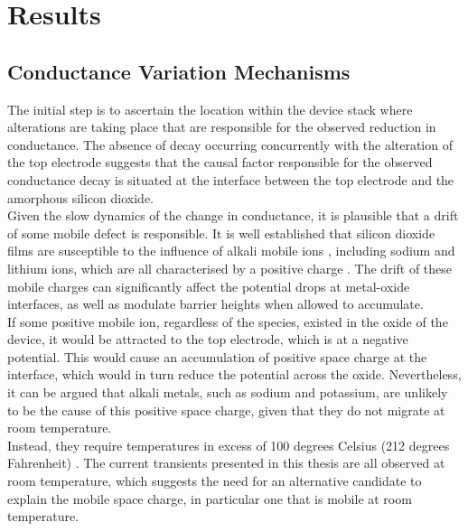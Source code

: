 \section[Results]{Results}

\subsection[Conductance Variation Mechanisms]{Conductance Variation Mechanisms}

The initial step is to ascertain the location within the device stack where alterations are taking place that are responsible for the observed reduction in conductance. The absence of decay occurring concurrently with the alteration of the top electrode suggests that the causal factor responsible for the observed conductance decay is situated at the interface between the top electrode and the amorphous silicon dioxide. \\

\noindent Given the slow dynamics of the change in conductance, it is plausible that a drift of some mobile defect is responsible. It is well established that silicon dioxide films are susceptible to the influence of alkali mobile ions \cite{snow1965ion}, including sodium and lithium ions, which are all characterised by a positive charge \cite{yon1966sodium}. The drift of these mobile charges can significantly affect the potential drops at metal-oxide interfaces, as well as modulate barrier heights when allowed to accumulate.\\

\noindent If some positive mobile ion, regardless of the species, existed in the oxide of the device, it would be attracted to the top electrode, which is at a negative potential. This would cause an accumulation of positive space charge at the interface, which would in turn reduce the potential across the oxide. Nevertheless, it can be argued that alkali metals, such as sodium and potassium, are unlikely to be the cause of this positive space charge, given that they do not migrate at room temperature. \\

\noindent Instead, they require temperatures in excess of 100 degrees Celsius (212 degrees Fahrenheit) \cite{deal1974current}. The current transients presented in this thesis are all observed at room temperature, which suggests the need for an alternative candidate to explain the mobile space charge, in particular one that is mobile at room temperature. \\

